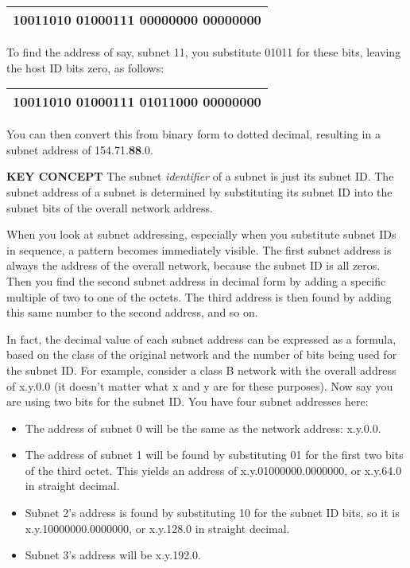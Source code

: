 \begin{longtable}[]{@{}l@{}}
\toprule
\endhead
10011010 01000111 {\textbf{00000}}000 00000000\tabularnewline
\bottomrule
\end{longtable}

To find the address of say, subnet 11, you substitute 01011 for these
bits, leaving the host ID bits zero, as follows:

\begin{longtable}[]{@{}l@{}}
\toprule
\endhead
10011010 01000111 {\textbf{01011}}000 00000000\tabularnewline
\bottomrule
\end{longtable}

You can then convert this from binary form to dotted decimal, resulting
in a subnet address of 154.71.{\textbf{88}}.0.


{\textbf{KEY CONCEPT}} The subnet {\emph{identifier}} of a subnet is
just its subnet ID. The subnet address of a subnet is determined by
substituting its subnet ID into the subnet bits of the overall network
address.

When you look at subnet addressing, especially when you substitute
subnet IDs in sequence, a pattern becomes immediately visible. The first
subnet address is always the address of the overall network, because the
subnet ID is all zeros. Then you find the second subnet address in
decimal form by adding a specific multiple of two to one of the octets.
The third address is then found by adding this same number to the second
address, and so on.

In fact, the decimal value of each subnet address can be expressed as a
formula, based on the class of the original network and the number of
bits being used for the subnet ID. For example, consider a class B
network with the overall address of x.y.0.0 (it doesn't matter what x
and y are for these purposes). Now say you are using two bits for the
subnet ID. You have four subnet
addresses
here:

\begin{itemize}
\item
  The address of subnet 0 will be the same as the network address:
  x.y.0.0.
\item
  The address of subnet 1 will be found by substituting 01 for the first
  two bits of the third octet. This yields an address of
  x.y.01000000.0000000, or x.y.64.0 in straight decimal.
\item
  Subnet 2's address is found by substituting 10 for the subnet ID bits,
  so it is x.y.10000000.0000000, or x.y.128.0 in straight decimal.
\item
  Subnet 3's address will be x.y.192.0.
\end{itemize}

